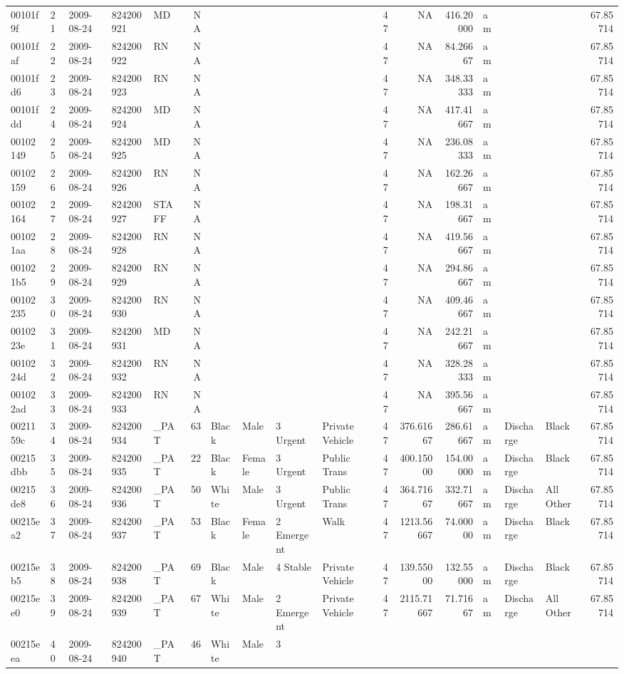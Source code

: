 \documentclass[]{elsarticle} %
\begin{document}
\begin{longtable}[]{@{}lllllrllllrrrlllr@{}}
00101f9f & 21 & 2009-08-24 & 824200921 & MD & NA & & & & & 47 & NA &
416.20000 & am & & & 67.85714\tabularnewline
00101faf & 22 & 2009-08-24 & 824200922 & RN & NA & & & & & 47 & NA &
84.26667 & am & & & 67.85714\tabularnewline
00101fd6 & 23 & 2009-08-24 & 824200923 & RN & NA & & & & & 47 & NA &
348.33333 & am & & & 67.85714\tabularnewline
00101fdd & 24 & 2009-08-24 & 824200924 & MD & NA & & & & & 47 & NA &
417.41667 & am & & & 67.85714\tabularnewline
00102149 & 25 & 2009-08-24 & 824200925 & MD & NA & & & & & 47 & NA &
236.08333 & am & & & 67.85714\tabularnewline
00102159 & 26 & 2009-08-24 & 824200926 & RN & NA & & & & & 47 & NA &
162.26667 & am & & & 67.85714\tabularnewline
00102164 & 27 & 2009-08-24 & 824200927 & STAFF & NA & & & & & 47 & NA &
198.31667 & am & & & 67.85714\tabularnewline
001021aa & 28 & 2009-08-24 & 824200928 & RN & NA & & & & & 47 & NA &
419.56667 & am & & & 67.85714\tabularnewline
001021b5 & 29 & 2009-08-24 & 824200929 & RN & NA & & & & & 47 & NA &
294.86667 & am & & & 67.85714\tabularnewline
00102235 & 30 & 2009-08-24 & 824200930 & RN & NA & & & & & 47 & NA &
409.46667 & am & & & 67.85714\tabularnewline
0010223e & 31 & 2009-08-24 & 824200931 & MD & NA & & & & & 47 & NA &
242.21667 & am & & & 67.85714\tabularnewline
0010224d & 32 & 2009-08-24 & 824200932 & RN & NA & & & & & 47 & NA &
328.28333 & am & & & 67.85714\tabularnewline
001022ad & 33 & 2009-08-24 & 824200933 & RN & NA & & & & & 47 & NA &
395.56667 & am & & & 67.85714\tabularnewline
0021159c & 34 & 2009-08-24 & 824200934 & \_PAT & 63 & Black & Male & 3
Urgent & Private Vehicle & 47 & 376.61667 & 286.61667 & am & Discharge &
Black & 67.85714\tabularnewline
00215dbb & 35 & 2009-08-24 & 824200935 & \_PAT & 22 & Black & Female & 3
Urgent & Public Trans & 47 & 400.15000 & 154.00000 & am & Discharge &
Black & 67.85714\tabularnewline
00215de8 & 36 & 2009-08-24 & 824200936 & \_PAT & 50 & White & Male & 3
Urgent & Public Trans & 47 & 364.71667 & 332.71667 & am & Discharge &
All Other & 67.85714\tabularnewline
00215ea2 & 37 & 2009-08-24 & 824200937 & \_PAT & 53 & Black & Female & 2
Emergent & Walk & 47 & 1213.56667 & 74.00000 & am & Discharge & Black &
67.85714\tabularnewline
00215eb5 & 38 & 2009-08-24 & 824200938 & \_PAT & 69 & Black & Male & 4
Stable & Private Vehicle & 47 & 139.55000 & 132.55000 & am & Discharge &
Black & 67.85714\tabularnewline
00215ee0 & 39 & 2009-08-24 & 824200939 & \_PAT & 67 & White & Male & 2
Emergent & Private Vehicle & 47 & 2115.71667 & 71.71667 & am & Discharge
& All Other & 67.85714\tabularnewline
00215eea & 40 & 2009-08-24 & 824200940 & \_PAT & 46 & White & Male & 3

\end{longtable}
\end{document}

